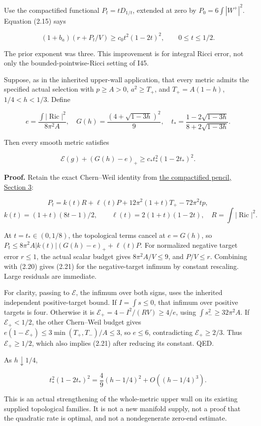 \documentclass[
  11pt,
]{article}
\begin{document}
Use the compactified functional \(P_t=tD_{1/t}\), extended at zero by
\(P_0=6\int|W^+|^2\). Equation (2.15) says

\[
 \boxed{(1+b_a)(r+P_t/V)\ge c_0t^2(1-2t)^2,
                    \qquad 0\le t\le1/2.}
 \tag{2.20}
\]

The prior exponent was three. This improvement is for integral Ricci
error, not only the bounded-pointwise-Ricci setting of I45.

Suppose, as in the inherited upper-wall application, that every metric
admits the specified actual selection with \(p\ge A>0\), \(a^2\ge T_+\),
and \(T_+=A(1-h)\), \(1/4<h<1/3\). Define

\[
 e=\frac{\int|\operatorname{Ric}|^2}{8\pi^2A},\quad
 G(h)=\frac{(4+\sqrt{1-3h})^2}{9},\quad
 t_* =\frac{1-2\sqrt{1-3h}}{8+2\sqrt{1-3h}}.
\]

Then every smooth metric satisfies

\[
 \boxed{\mathcal E(g)+(G(h)-e)_+
                    \ge c_* t_*^2(1-2t_*)^2.}
 \tag{2.21}
\]

\textbf{Proof.} Retain the exact Chern--Weil identity from
\href{../mathematics/current/line1_compactified_pencil.md}{the
compactified pencil, Section 3}:

\[
 P_t=k(t)R+\ell(t)P+12\pi^2(1+t)T_+-72\pi^2tp,
\] \[
 k(t)=(1+t)(8t-1)/2,\qquad \ell(t)=2(1+t)(1-2t),
 \quad R=\int|\operatorname{Ric}|^2.
\]

At \(t=t_*\in(0,1/8)\), the topological terms cancel at \(e=G(h)\), so
\(P_t\le8\pi^2A|k(t)|(G(h)-e)_++\ell(t)P\). For normalized negative
target error \(r\le1\), the actual scalar budget gives
\(8\pi^2A/V\le9\), and \(P/V\le r\). Combining with (2.20) gives (2.21)
for the negative-target infimum by constant rescaling. Large residuals
are immediate.

For clarity, passing to \(\mathcal E\), the infimum over both signs,
uses the inherited independent positive-target bound. If
\(I=\int s\le0\), that infimum over positive targets is four. Otherwise
it is \(\mathcal E_+=4-I^2/(RV)\ge4/e\), using
\(\int s_-^2\ge32\pi^2A\). If \(\mathcal E_+<1/2\), the other
Chern--Weil budget gives \(e(1-\mathcal E_+)\le3\min(T_+,T_-)/A\le3\),
so \(e\le6\), contradicting \(\mathcal E_+\ge2/3\). Thus
\(\mathcal E_+\ge1/2\), which also implies (2.21) after reducing its
constant. QED.

As \(h\downarrow1/4\),

\[
 t_*^2(1-2t_*)^2=\frac49(h-1/4)^2+O((h-1/4)^3).
\]

This is an actual strengthening of the whole-metric upper wall on its
existing supplied topological families. It is not a new manifold supply,
not a proof that the quadratic rate is optimal, and not a nondegenerate
zero-end estimate.
\end{document}
